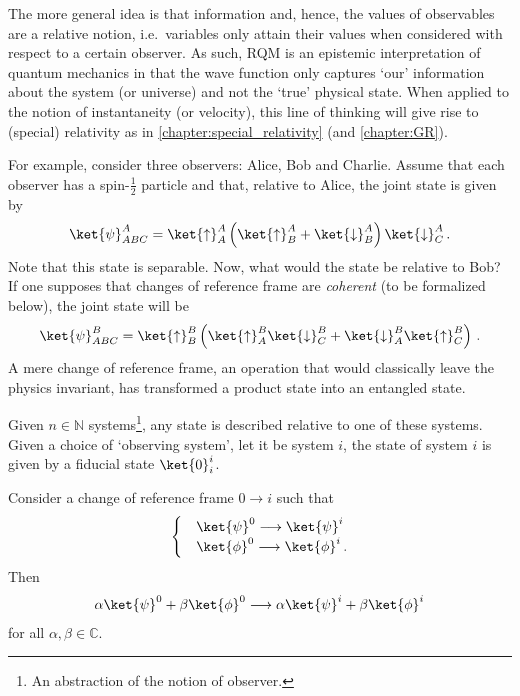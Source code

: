     The more general idea is that information and, hence, the values of observables are a relative notion, i.e.~variables only attain their values when considered with respect to a certain observer. As such, RQM is an epistemic interpretation of quantum mechanics in that the wave function only captures `our' information about the system (or universe) and not the `true' physical state. When applied to the notion of instantaneity (or velocity), this line of thinking will give rise to (special) relativity as in \cref{chapter:special_relativity} (and \cref{chapter:GR}).


    For example, consider three observers: Alice, Bob and Charlie. Assume that each observer has a spin-$\tfrac{1}{2}$ particle and that, relative to Alice, the joint state is given by
    \begin{gather}
        \ket{\psi}^A_{ABC} = \ket{\uparrow}^A_A\left(\ket{\uparrow}^A_B+\ket{\downarrow}^A_B\right)\ket{\downarrow}^A_C\,.
    \end{gather}
    Note that this state is separable. Now, what would the state be relative to Bob? If one supposes that changes of reference frame are \textit{coherent} (to be formalized below), the joint state will be
    \begin{gather}
        \ket{\psi}^B_{ABC} = \ket{\uparrow}^B_B\left(\ket{\uparrow}^B_A\ket{\downarrow}^B_C+\ket{\downarrow}^B_A\ket{\uparrow}^B_C\right)\,.
    \end{gather}
    A mere change of reference frame, an operation that would classically leave the physics invariant, has transformed a product state into an entangled state.

    \begin{axiom}
        Given $n\in\mathbb{N}$ systems\footnote{An abstraction of the notion of observer.}, any state is described relative to one of these systems. Given a choice of `observing system', let it be system $i$, the state of system $i$ is given by a fiducial state $\ket{0}^i_i$.
    \end{axiom}

    \begin{axiom}
        Consider a change of reference frame $0\longrightarrow i$ such that
        \begin{gather}
            \begin{cases}
                &\ket{\psi}^0\longrightarrow\ket{\psi}^i\\
                &\ket{\phi}^0\longrightarrow\ket{\phi}^i\,.
            \end{cases}
        \end{gather}
        Then
        \begin{gather}
            \alpha\ket{\psi}^0+\beta\ket{\phi}^0\longrightarrow\alpha\ket{\psi}^i+\beta\ket{\phi}^i
        \end{gather}
        for all $\alpha,\beta\in\mathbb{C}$.
    \end{axiom}

